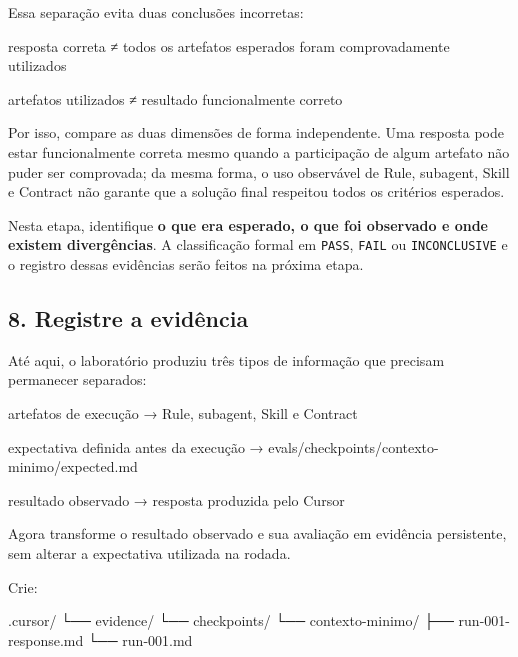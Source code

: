 \documentclass[
  10pt,
  a4paper,
  oneside]{book}
\newenvironment{Shaded}{}{}
\newcommand{\NormalTok}[1]{#1}
\renewenvironment{Shaded}{\begin{snugshade}}{\end{snugshade}}%
\begin{document}
Essa separação evita duas conclusões incorretas:

\begin{Shaded}
\begin{Highlighting}[]
\NormalTok{resposta correta}
\NormalTok{≠}
\NormalTok{todos os artefatos esperados foram comprovadamente utilizados}

\NormalTok{artefatos utilizados}
\NormalTok{≠}
\NormalTok{resultado funcionalmente correto}
\end{Highlighting}
\end{Shaded}

Por isso, compare as duas dimensões de forma independente. Uma resposta
pode estar funcionalmente correta mesmo quando a participação de algum
artefato não puder ser comprovada; da mesma forma, o uso observável de
Rule, subagent, Skill e Contract não garante que a solução final
respeitou todos os critérios esperados.

Nesta etapa, identifique \textbf{o que era esperado, o que foi observado
e onde existem divergências}. A classificação formal em \texttt{PASS},
\texttt{FAIL} ou \texttt{INCONCLUSIVE} e o registro dessas evidências
serão feitos na próxima etapa.

\hypertarget{registre-a-eviduxeancia}{%
\subsection{8. Registre a evidência}\label{registre-a-eviduxeancia}}

Até aqui, o laboratório produziu três tipos de informação que precisam
permanecer separados:

\begin{Shaded}
\begin{Highlighting}[]
\NormalTok{artefatos de execução}
\NormalTok{→ Rule, subagent, Skill e Contract}

\NormalTok{expectativa definida antes da execução}
\NormalTok{→ evals/checkpoints/contexto{-}minimo/expected.md}

\NormalTok{resultado observado}
\NormalTok{→ resposta produzida pelo Cursor}
\end{Highlighting}
\end{Shaded}

Agora transforme o resultado observado e sua avaliação em evidência
persistente, sem alterar a expectativa utilizada na rodada.

Crie:

\begin{Shaded}
\begin{Highlighting}[]
\NormalTok{.cursor/}
\NormalTok{└── evidence/}
\NormalTok{    └── checkpoints/}
\NormalTok{        └── contexto{-}minimo/}
\NormalTok{            ├── run{-}001{-}response.md}
\NormalTok{            └── run{-}001.md}
\end{Highlighting}
\end{Shaded}
\end{document}
